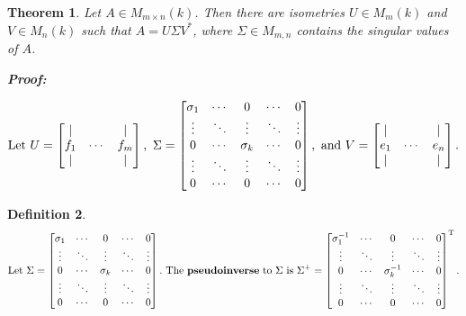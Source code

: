 \documentclass{article}
\theoremstyle{colontheorem}
\newtheorem{theorem}{Theorem}[section]
\newtheorem{definition}[theorem]{Definition}
\newenvironment{Theorem}
{
	\begin{mdframed}[backgroundcolor=TheoremOrange!10]
	\begin{theorem}
}
{
	\end{theorem}
	\end{mdframed}
	
	\vspace{.15in}
}
\newenvironment{Def}
{
	\begin{mdframed}[backgroundcolor=DefGreen!10]
	\begin{definition}
}
{
	\end{definition}
	\end{mdframed}
	
	\vspace{.15in}
}
\newenvironment{Proof}
{
	\begin{mdframed}[backgroundcolor=ProofPurple!10]
	\textbf{Proof:}%
}
{
	\end{mdframed}
	
	\vspace{.085in}
}
\begin{document}
\begin{Theorem}
	
	Let $A \in M_{m \times n}(k)$. Then there are isometries $U \in M_m(k)$ and $V \in M_n(k)$ such that $A = U \Sigma V^*$, where $\Sigma \in M_{m, n}$ contains the singular values of $A$.
	
	\begin{Proof}
		$$
			\textnormal{Let}\ U = \begin{bmatrix}
				| & & |\\
				f_1 & \cdots & f_m\\
				| & & |
			\end{bmatrix},\ \Sigma = \begin{bmatrix}
				\sigma_1 & \cdots & 0 & \cdots & 0\\
				\vdots & \ddots & \vdots & \ddots & \vdots\\
				0 & \cdots & \sigma_k & \cdots & 0\\
				\vdots & \ddots & \vdots & \ddots & \vdots\\
				0 & \cdots & 0 & \cdots & 0
			\end{bmatrix},\ \textnormal{and}\ V = \begin{bmatrix}
				| & & |\\
				e_1 & \cdots & e_n\\
				| & & |
			\end{bmatrix}.
		$$
		
	\end{Proof}
	
\end{Theorem}



\begin{Def}
	
	$$
		\textnormal{Let}\ \Sigma = \begin{bmatrix}
			\sigma_1 & \cdots & 0 & \cdots & 0\\
			\vdots & \ddots & \vdots & \ddots & \vdots\\
			0 & \cdots & \sigma_k & \cdots & 0\\
			\vdots & \ddots & \vdots & \ddots & \vdots\\
			0 & \cdots & 0 & \cdots & 0
		\end{bmatrix}.\ \textnormal{The \textbf{pseudoinverse} to}\ \Sigma\ \textnormal{is}\ \Sigma^+ = \begin{bmatrix}
			\sigma_1^{-1} & \cdots & 0 & \cdots & 0\\
			\vdots & \ddots & \vdots & \ddots & \vdots\\
			0 & \cdots & \sigma_k^{-1} & \cdots & 0\\
			\vdots & \ddots & \vdots & \ddots & \vdots\\
			0 & \cdots & 0 & \cdots & 0
		\end{bmatrix}^\textnormal{T}.
	$$
	
\end{Def}
\end{document}
